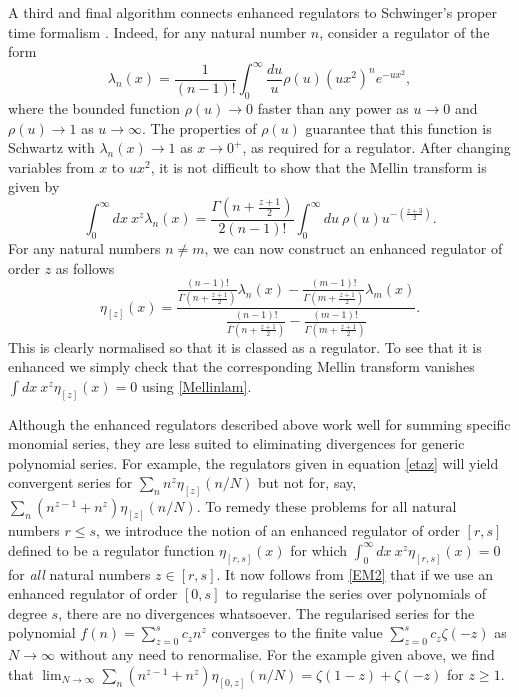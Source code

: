 \documentclass[12pt, letter]{article}
\def\be{\begin{equation}}
\def\ee{\end{equation}}
\begin{document}
A third and final algorithm connects enhanced regulators to Schwinger's proper time formalism \cite{SchwingerPT}. Indeed,  for any natural number $n$, consider a regulator of the form
\be
\lambda_n(x)=\frac{1}{(n-1)!}\int_0^\infty \frac{du}{u}  \rho(u)  (ux^2)^{n} e^{-ux^2} \label{lambdan},
\ee
where the bounded function $\rho(u) \to 0$ faster than any power as $u\to 0$ and $\rho(u) \to 1$ as $u \to \infty$. The properties of $\rho(u)$ guarantee  that this function is Schwartz with $\lambda_n(x) \to 1$ as $x \to 0^+$, as required for a regulator.  After changing variables from $x$ to $ux^2$,  it is not difficult to show that the Mellin transform is given by
\be \label{Mellinlam}
\int_0^\infty dx \ x^z \lambda_n(x)= \frac{\Gamma\left( n+\frac{z+1}{2}\right)}{2(n-1)!}\int_0^\infty du \ \rho(u)u^{-\left(\frac{z+3}{2}\right)}.
\ee
For any natural numbers $n\neq m$, we can now construct an enhanced regulator of order $z$ as follows
\be \label{enhlam}
\eta_{[z]}(x)=\frac{\frac{(n-1)!}{\Gamma\left( n+\frac{z+1}{2}\right)}\lambda_n(x)-\frac{(m-1)!}{\Gamma\left( m+\frac{z+1}{2}\right)}\lambda_m(x)}{\frac{(n-1)!}{\Gamma\left( n+\frac{z+1}{2}\right)}-\frac{(m-1)!}{\Gamma\left( m+\frac{z+1}{2}\right)}}.
\ee 
This is clearly normalised so that it is classed as a regulator. To see that it is enhanced we simply check that the corresponding Mellin transform vanishes $\int dx \  x^z\eta_{[z]}(x)=0$ using \eqref{Mellinlam}.




Although the enhanced regulators described above work well for summing specific monomial series, they are less suited to eliminating divergences for generic polynomial series. For example, the regulators given in equation \eqref{etaz} will yield convergent series for $\sum_n n^z \eta_{[z]}(n/N)$ but not for, say,  $\sum_n (n^{z-1}+n^z)\eta_{[z]}(n/N)$. To remedy these problems for all natural numbers $ r \leq s$, we introduce the notion of an enhanced regulator  of order $[r, s]$ defined to be a regulator function $\eta_{[r, s]}(x)$ for which
$
\int_0^\infty  dx  \ x^z \eta_{[r, s]}(x)=0
$
for {\it all} natural numbers $z  \in [r,  s]$. It now follows from \eqref{EM2} that if we use an enhanced regulator of order $[0,s]$ to  regularise the series over polynomials of degree $s$,  there are no divergences whatsoever. The regularised series for the polynomial  $f(n)=\sum_{z=0}^s c_z n^z$ converges to the finite  value $\sum_{z=0}^s c_z \zeta(-z)$ as $N\to \infty$ without any need to renormalise. For the example given above, we find that $\lim_{N \to \infty} \sum_n (n^{z-1}+n^z)\eta_{[0, z]}(n/N)=\zeta(1-z)+\zeta(-z)$ for $z\geq 1$.
\end{document}
